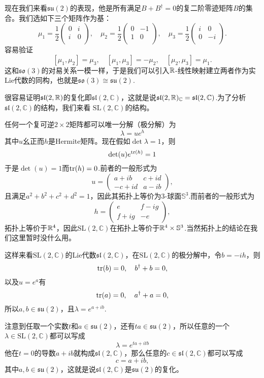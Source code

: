 \documentclass[8pt]{book}
\theoremstyle{plain}
\newcommand{\cc}{\mathbb{C}}
\begin{document}
现在我们来看$\mathfrak{su}(2)$的表现，他是所有满足$B+B^\dag=0$的复二阶零迹矩阵$B$的集合。我们选如下三个矩阵作为基：
\[
\mu_1=\frac{1}{2}\begin{pmatrix}
	0&i\\
	i&0\\
\end{pmatrix},\quad
\mu_2=\frac{1}{2}\begin{pmatrix}
	0&-1\\
	1&0\\
\end{pmatrix},\quad
\mu_3=\frac{1}{2}\begin{pmatrix}
	i&0\\
	0&-i\\
\end{pmatrix}.
\]
容易验证
\[
[\mu_1,\mu_2]=\mu_3,\quad [\mu_1,\mu_3]=-\mu_2,\quad [\mu_2,\mu_3]=\mu_1.
\]
这和$\mathfrak{so}(3)$的对易关系一模一样，于是我们可以引入$\mathbb{R}$-线性映射建立两者作为实Lie代数的同构，也就是$\mathfrak{so}(3)\cong \mathfrak{su}(2)$.

很容易证明$\mathfrak{sl}(2,\mathbb{R})$的复化即$\mathfrak{sl}(2,\cc)$，这就是说$\mathfrak{sl}(2,\rr)_\cc=\mathfrak{sl}(2,\cc)$.为了分析$\mathfrak{sl}(2,\cc)$的结构，我们来看
$\mathrm{SL}(2,\mathbb{C})$的结构。

任何一个复可逆$2\times 2$矩阵都可以唯一分解（极分解）为
\[
\lambda=ue^{h}
\]
其中$u$幺正而$h$是Hermite矩阵。现在假如$\det \lambda=1$，则
\[
\det(u)e^{\operatorname{tr}(h)}=1
\]
于是$\det(u)=1$而$\operatorname{tr}(h)=0$.前者的一般形式为
\[
u=
\begin{pmatrix}
a+ib&c+id\\
-c+id&a-ib
\end{pmatrix},
\]
且满足$a^2+b^2+c^2+d^2=1$，因此其拓扑上等价为3-球面$\mathbb{S}^3$.而前者的一般形式为
\[
h=\begin{pmatrix}
e&f-ig\\
f+ig&-e
\end{pmatrix},
\]
拓扑上等价于$\mathbb{R}^4$，因此$\mathrm{SL}(2,\cc)$在拓扑上等价于$\mathbb{R}^4\times \mathbb{S}^3$.当然拓扑上的结论在我们这里暂时没什么用。

这样来看$\mathrm{SL}(2,\cc)$的Lie代数$\mathfrak{sl}(2,\mathbb{C})$，在$\mathrm{SL}(2,\cc)$的极分解中，令$b=-ih$，则
\[
\operatorname{tr}(b)=0,\quad b^\dag+b=0,
\]
以及$u=e^a$有
\[
\operatorname{tr}(a)=0,\quad a^\dag+a=0,
\]
所以$a,b\in\mathfrak{su}(2)$，且$\lambda=e^{a+ib}$.

注意到任取一个实数$t$和$a\in\mathfrak{su}(2)$，还有$ta \in\mathfrak{su}(2)$，所以任意的一个$\lambda \in \mathrm{SL}(2,\cc)$都可以写成
\[
\lambda=e^{ta+itb}
\]
他在$t=0$的导数$a+ib$就构成$\mathfrak{sl}(2,\cc)$，那么任意的$c\in \mathfrak{sl}(2,\cc)$都可以写成
\[
c=a+ib,
\]
其中$a,b\in\mathfrak{su}(2)$，这就是说$\mathfrak{sl}(2,\cc)$是$\mathfrak{su}(2)$的复化。
\end{document}
